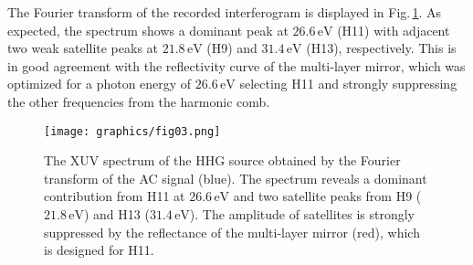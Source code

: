 \documentclass[fleqn,10pt]{wlscirep}
\begin{document}
The Fourier transform of the recorded interferogram is displayed in Fig.\,\ref{fig:HHGspectrum}. As expected, the spectrum shows a dominant peak at $\mathrm{26.6\,eV}$ (H11) with adjacent two weak satellite peaks at $\mathrm{21.8\,eV}$ (H9) and $\mathrm{31.4\,eV}$ (H13), respectively. This is in good agreement with the reflectivity curve of the multi-layer mirror, which was optimized for a photon energy of $\mathrm{26.6\,eV}$ selecting H11 and strongly suppressing the other frequencies from the harmonic comb.\\   
\begin{figure}[t!]
\centering
\texttt{[image: graphics/fig03.png]}
\caption{The XUV spectrum of the HHG source obtained by the Fourier transform of the AC signal (blue). The spectrum reveals a dominant contribution from H11 at $\mathrm{26.6\,eV}$ and two satellite peaks from H9 ($\mathrm{21.8\,eV}$) and H13 ($\mathrm{31.4\,eV}$). The amplitude of satellites is strongly suppressed by the reflectance of the multi-layer mirror (red), which is designed for H11.}
\label{fig:HHGspectrum}
\end{figure}
\end{document}
